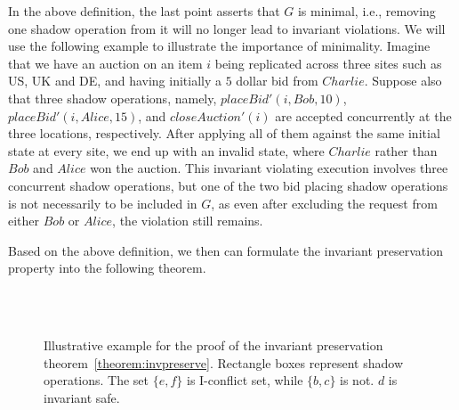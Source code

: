 In the above definition, the last point asserts that
$G$ is minimal, i.e., removing one shadow operation from it will no
longer lead to invariant violations. We will use the following example to illustrate
the importance of minimality. Imagine that we have an auction on an item $i$ 
being replicated across three sites such as US, UK and DE,
and having initially a $5$ dollar bid from $Charlie$. Suppose also that three shadow operations,
namely, $placeBid'(i, Bob, 10)$, $placeBid'(i, Alice, 15)$, and 
$closeAuction'(i)$ are accepted concurrently at the three locations, respectively. 
After applying all of them against the same initial state at every site,
we end up with an invalid state, where $Charlie$ rather than $Bob$ and $Alice$ won
the auction. This invariant violating execution
involves three concurrent shadow operations, but one of the two bid placing shadow
operations is not necessarily to be included in $G$, as even after excluding
the request from either $Bob$ or $Alice$, the violation still remains.   

Based on the above definition, we then can
 formulate the invariant preservation property into the following theorem.

\begin{figure}[t!]
\begin{minipage}[t]{0.5\textwidth}
\end{minipage}
\begin{minipage}[t]{0.5\textwidth}
\centering
{}\\
\\
\end{minipage}
\caption{Illustrative example for the proof of the invariant preservation theorem~\ref{theorem:invpreserve}. Rectangle boxes represent
shadow operations. The set $\{e, f\}$ is I-conflict set, while $\{b, c\}$ is not. $d$ is invariant safe.}
\label{fig:invarexample}
\end{figure}
\fi

